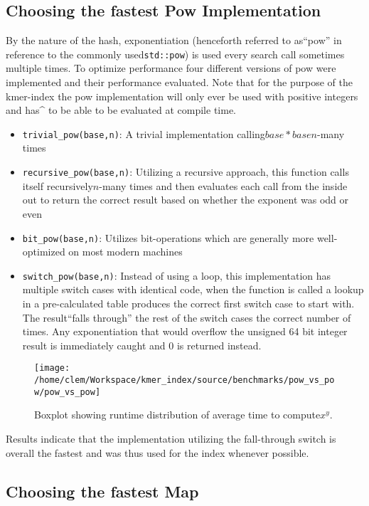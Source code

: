 \subsection{Choosing the fastest Pow Implementation}

By the nature of the hash, exponentiation (henceforth referred to
as``pow'' in reference to the commonly used\lstinline{std::pow})
is used every search call sometimes multiple times. To optimize performance
four different versions of pow were implemented and their performance
evaluated. Note that for the purpose of the kmer-index the pow implementation
will only ever be used with positive integers and has\textasciicircum{}
to be able to be evaluated at compile time.
\begin{itemize}
\item \lstinline{trivial_pow(base,n)}: A trivial implementation calling$base*base$$n$-many
times
\item \lstinline{recursive_pow(base,n)}: Utilizing a recursive approach,
this function calls itself recursively$n$-many times and then evaluates
each call from the inside out to return the correct result based on
whether the exponent was odd or even
\item \lstinline{bit_pow(base,n)}: Utilizes bit-operations which are generally
more well-optimized on most modern machines
\item \lstinline{switch_pow(base,n)}: Instead of using a loop, this implementation
has multiple switch cases with identical code, when the function is
called a lookup in a pre-calculated table produces the correct first
switch case to start with. The result``falls through'' the rest
of the switch cases the correct number of times. Any exponentiation
that would overflow the unsigned 64 bit integer result is immediately
caught and 0 is returned instead.
\end{itemize}
\begin{figure}[H]
\textasciiacute \texttt{[image: /home/clem/Workspace/kmer\_index/source/benchmarks/pow\_vs\_pow/pow\_vs\_pow]}

\caption{Boxplot showing runtime distribution of average time to compute$x^{y}$.}
\end{figure}

Results indicate that the implementation utilizing the fall-through
switch is overall the fastest and was thus used for the index whenever
possible.

\subsection{Choosing the fastest Map}

